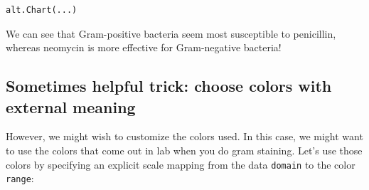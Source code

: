 \documentclass[
  letterpaper,
  DIV=11,
  numbers=noendperiod]{scrartcl}
\begin{document}
\begin{verbatim}
alt.Chart(...)
\end{verbatim}

We can see that Gram-positive bacteria seem most susceptible to
penicillin, whereas neomycin is more effective for Gram-negative
bacteria!

\subsection{Sometimes helpful trick: choose colors with external
meaning}\label{sometimes-helpful-trick-choose-colors-with-external-meaning}

However, we might wish to customize the colors used. In this case, we
might want to use the colors that come out in lab when you do gram
staining. Let's use those colors by specifying an explicit scale mapping
from the data \texttt{domain} to the color \texttt{range}:
\end{document}
